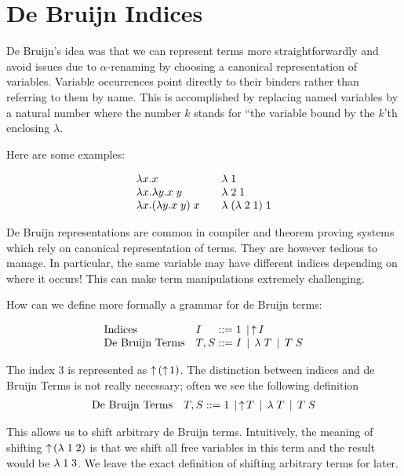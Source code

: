 \section{De Bruijn Indices}\label{sec:debruijn}

De Bruijn's idea was that we can represent terms more
straightforwardly and avoid issues due to $\alpha$-renaming by
choosing a canonical representation of variables. Variable occurrences
point directly to their binders rather than referring to them by
name. This is accomplished by replacing named variables by a natural
number where the number $k$ stands for ``the variable bound by the
$k$'th enclosing $\lambda$.

Here are some examples:

\[
\begin{array}{l@{\qquad}l}
\lam x. x  & \lamdb 1 \\
\lam x. \lam y . x\;y & \lamdb 2\; 1\\
\lam x. (\lam y. x \; y)\; x & \lamdb (\lamdb 2\;1) \;1
\end{array}
\]

De Bruijn representations are common in compiler and theorem proving
systems which rely on canonical representation of terms. They are
however tedious to manage. In particular, the same variable may have
different indices depending on where it occurs! This can make term
manipulations extremely challenging.

How can we define more formally a grammar for de Bruijn terms:

\[
\begin{array}{ll@{\bnfas}l}
\mbox{Indices}         & I    & 1 \bnfalt \shift I \\
\mbox{De Bruijn Terms} & T, S & I \bnfalt \lamdb T \bnfalt T \app S
\end{array}
\]

The index $3$ is represented as $\uparrow^{}\!(\uparrow^{}\!1)$. The distinction
between indices and de Bruijn Terms is not really necessary; often we
see the following definition
\[
\begin{array}{ll@{\bnfas}l}
\mbox{De Bruijn Terms} & T, S & 1 \bnfalt \shift T \bnfalt \lamdb T \bnfalt T \app S
\end{array}
\]

This allows us to shift arbitrary de Bruijn terms. Intuitively, the
meaning of shifting $\uparrow^{}\!(\lambda\; 1 \; 2)$ is that we shift all free
variables in this term and the result would be $\lambda\; 1 \; 3$. We leave
the exact definition of shifting arbitrary terms for later.


